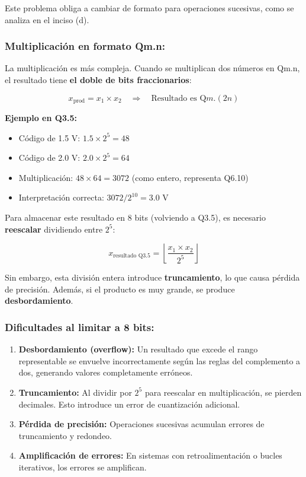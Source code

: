 \documentclass[12pt]{article}
\begin{document}
Este problema obliga a cambiar de formato para operaciones sucesivas, como se analiza en el inciso (d).
 
\subsubsection*{Multiplicación en formato Qm.n:}
 
La multiplicación es más compleja. Cuando se multiplican dos números en Qm.n, el resultado tiene \textbf{el doble de bits fraccionarios}:
 
\begin{equation}
x_{\text{prod}} = x_1 \times x_2 \quad \Rightarrow \quad \text{Resultado es } \text{Q}m.(2n)
\end{equation}
 
\textbf{Ejemplo en Q3.5:}
\begin{itemize}
    \item Código de 1.5 V: $1.5 \times 2^5 = 48$
    \item Código de 2.0 V: $2.0 \times 2^5 = 64$
    \item Multiplicación: $48 \times 64 = 3072$ (como entero, representa Q6.10)
    \item Interpretación correcta: $3072 / 2^{10} = 3.0$ V \checkmark
\end{itemize}
 
Para almacenar este resultado en 8 bits (volviendo a Q3.5), es necesario \textbf{reescalar} dividiendo entre $2^5$:
 
\begin{equation}
x_{\text{resultado Q3.5}} = \left\lfloor \frac{x_1 \times x_2}{2^5} \right\rfloor
\end{equation}
 
Sin embargo, esta división entera introduce \textbf{truncamiento}, lo que causa pérdida de precisión. Además, si el producto es muy grande, se produce \textbf{desbordamiento}.
 
\subsubsection*{Dificultades al limitar a 8 bits:}
 
\begin{enumerate}
    \item \textbf{Desbordamiento (overflow):} Un resultado que excede el rango representable se envuelve incorrectamente según las reglas del complemento a dos, generando valores completamente erróneos.
    
    \item \textbf{Truncamiento:} Al dividir por $2^5$ para reescalar en multiplicación, se pierden decimales. Esto introduce un error de cuantización adicional.
    
    \item \textbf{Pérdida de precisión:} Operaciones sucesivas acumulan errores de truncamiento y redondeo.
    
    \item \textbf{Amplificación de errores:} En sistemas con retroalimentación o bucles iterativos, los errores se amplifican.
\end{enumerate}
 
\end{document}
